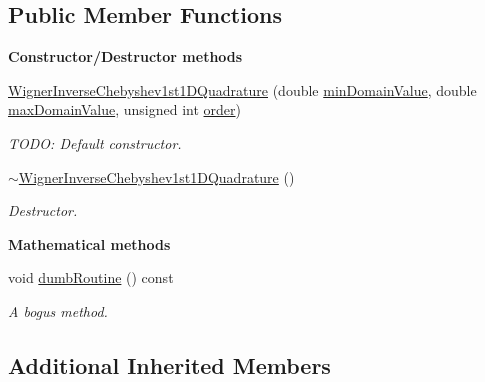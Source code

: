 \subsection*{Public Member Functions}
\begin{Indent}{\bf Constructor/\-Destructor methods}\par
\begin{DoxyCompactItemize}
\item 
\hyperlink{class_q_u_e_s_o_1_1_wigner_inverse_chebyshev1st1_d_quadrature_a8a40172427db7b72e0885c30f745ad13}{Wigner\-Inverse\-Chebyshev1st1\-D\-Quadrature} (double \hyperlink{class_q_u_e_s_o_1_1_base1_d_quadrature_a938187458b0069e7b3779bc3739a1cc0}{min\-Domain\-Value}, double \hyperlink{class_q_u_e_s_o_1_1_base1_d_quadrature_af3d09abe6716a23f9061b8b657524547}{max\-Domain\-Value}, unsigned int \hyperlink{class_q_u_e_s_o_1_1_base1_d_quadrature_a07713b5e8df24bbc8e3e9d13b707e5d0}{order})
\begin{DoxyCompactList}\small\item\em T\-O\-D\-O\-: Default constructor. \end{DoxyCompactList}\item 
\hyperlink{class_q_u_e_s_o_1_1_wigner_inverse_chebyshev1st1_d_quadrature_a0dc8250c94e72042eb233577b51a5087}{$\sim$\-Wigner\-Inverse\-Chebyshev1st1\-D\-Quadrature} ()
\begin{DoxyCompactList}\small\item\em Destructor. \end{DoxyCompactList}\end{DoxyCompactItemize}
\end{Indent}
\begin{Indent}{\bf Mathematical methods}\par
\begin{DoxyCompactItemize}
\item 
void \hyperlink{class_q_u_e_s_o_1_1_wigner_inverse_chebyshev1st1_d_quadrature_aacf526849bf3bcec245d12f14d24352d}{dumb\-Routine} () const 
\begin{DoxyCompactList}\small\item\em A bogus method. \end{DoxyCompactList}\end{DoxyCompactItemize}
\end{Indent}
\subsection*{Additional Inherited Members}


